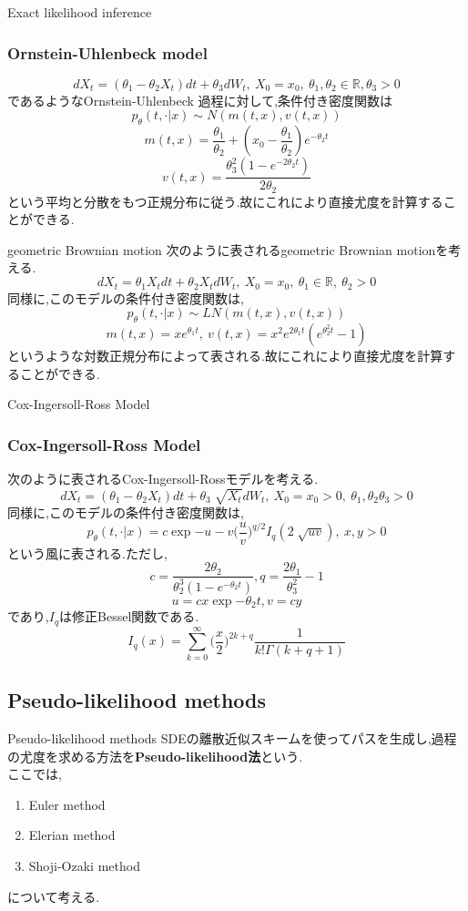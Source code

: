 \documentclass[dvipdfmx,cjk]{beamer}
\numberwithin{equation}{section}
\def\R{\mathbb R}
\begin{document}
\begin{frame}{Exact likelihood inference}

\subsubsection{Ornstein-Uhlenbeck model}
\[
dX_t = (\theta_1 - \theta_2 X_t )  dt + \theta_3 dW_t ,\  X_0=x_0, \ \theta_1,\theta_2\in \R,\theta_3>0
\]
であるようなOrnstein-Uhlenbeck 過程に対して,条件付き密度関数は
\[
p_\theta(t,\cdot | x) \sim N(m(t,x),v(t,x))
\]
\[
m(t,x) = \frac{\theta_1}{\theta_2} + (x_0 -\frac{\theta_1}{\theta_2} ) e^{-\theta_2 t}
\]
\[
v(t,x) = \frac{\theta_3^2(1-e^{-2\theta_2 t})}{2\theta_2} 
\]
という平均と分散をもつ正規分布に従う.故にこれにより直接尤度を計算することができる.
\end{frame}
\begin{frame}{geometric Brownian motion}
次のように表されるgeometric Brownian motionを考える.
\[
dX_t = \theta_1 X_t dt + \theta_2 X_t dW_t , \ X_0 = x_0 ,\ \theta_1 \in \R,\ \theta_2 >0
\]
同様に,このモデルの条件付き密度関数は,
\[
p_\theta (t,\cdot | x)  \sim LN(m(t,x),v(t,x))
\]
\[
m(t,x)=xe^{\theta_1 t},\ v(t,x)=x^2 e^{2\theta_1 t} (e^{\theta_2^2 t} -1)
\]
というような対数正規分布によって表される.故にこれにより直接尤度を計算することができる.
\end{frame}
\begin{frame}{Cox-Ingersoll-Ross Model}
\subsubsection{Cox-Ingersoll-Ross Model}
次のように表されるCox-Ingersoll-Rossモデルを考える.
\[
dX_t = (\theta_1 - \theta_2 X_t )  dt + \theta_3 \sqrt[]{X_t} dW_t ,\  X_0=x_0>0, \ \theta_1,\theta_2 \theta_3>0
\]
同様に,このモデルの条件付き密度関数は,
\[
p_\theta (t,\cdot | x) = c\exp{-u-v} \biggl(\frac{u}{v}\biggl)^{q/2} I_q(2\sqrt[]{uv}),\ x,y>0
\]
という風に表される.ただし,
\[
c = \frac{2\theta_2}{\theta_2^3(1-e^{-\theta_2 t})} , q= \frac{2\theta_1}{\theta_3^2} -1
\]
\[
u = cx\exp{-\theta_2 t} , v = cy
\]
であり,$I_q$は修正Bessel関数である.
\[
I_q(x)= \sum_{k=0}^\infty \biggl( \frac{x}{2}\biggl)^{2k+q} \frac{1}{k! \Gamma(k+q+1)}
\]
\end{frame}
\subsection{Pseudo-likelihood methods}

\begin{frame}{Pseudo-likelihood methods}
SDEの離散近似スキームを使ってパスを生成し,過程の尤度を求める方法を{\bf Pseudo-likelihood法}という.\\
ここでは,
\begin{enumerate}
\item Euler method
\item Elerian method
\item Shoji-Ozaki method
\end{enumerate}
について考える.
\end{frame}
\end{document}
